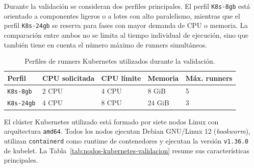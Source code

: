 Durante la validación se consideran dos perfiles principales. El perfil \texttt{K8s-8gb} está orientado a componentes ligeros o a lotes con alto paralelismo, mientras que el perfil \texttt{K8s-24gb} se reserva para fases con mayor demanda de CPU o memoria. La comparación entre ambos no se limita al tiempo individual de ejecución, sino que también tiene en cuenta el número máximo de runners simultáneos.

\begin{table}[htbp]
    \centering
    \caption{Perfiles de runners Kubernetes utilizados durante la validación.}
    \label{tab:entorno-kubernetes-validacion}
    \begin{tabular}{p{}p{}p{}p{}p{}}
        \hline
        \textbf{Perfil} & \textbf{CPU solicitada} & \textbf{CPU límite} & \textbf{Memoria} & \textbf{Máx. runners} \\
        \hline
        \texttt{K8s-8gb} & 2 CPU & 4 CPU & 8 GiB & 5 \\
        \texttt{K8s-24gb} & 4 CPU & 8 CPU & 24 GiB & 3 \\
        \hline
    \end{tabular}
\end{table}

El clúster Kubernetes utilizado está formado por siete nodos Linux con arquitectura \texttt{amd64}. Todos los nodos ejecutan Debian GNU/Linux 12 (\textit{bookworm}), utilizan \texttt{containerd} como runtime de contenedores y ejecutan la versión \texttt{v1.36.0} de kubelet. La Tabla~\ref{tab:nodos-kubernetes-validacion} resume sus características principales.

